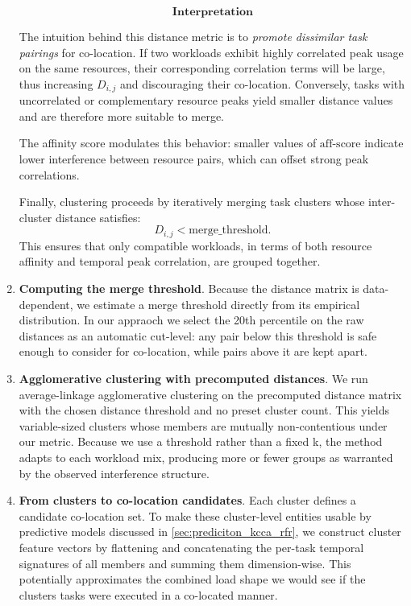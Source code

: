 \begin{enumerate}
          \[
              \textbf{Interpretation}
          \]

          The intuition behind this distance metric is to
          \emph{promote dissimilar task pairings} for co-location.
          If two workloads exhibit highly correlated peak usage on the same resources,
          their corresponding correlation terms will be large,
          thus increasing \( D_{i,j} \) and discouraging their co-location.
          Conversely, tasks with uncorrelated or complementary resource peaks
          yield smaller distance values and are therefore more suitable to merge.

          The affinity score modulates this behavior:
          smaller values of \( \mathrm{aff\text{-}score} \)
          indicate lower interference between resource pairs,
          which can offset strong peak correlations.

          Finally, clustering proceeds by iteratively merging task clusters
          whose inter-cluster distance satisfies:
          \[
              D_{i,j} < \text{merge\_threshold}.
          \]
          This ensures that only compatible workloads, in terms of both
          resource affinity and temporal peak correlation, are grouped together.
    \item \textbf{Computing the merge threshold}. Because the distance matrix is data-dependent, we estimate a merge threshold directly from its empirical distribution. In our appraoch we select the 20th percentile on the raw distances as an automatic cut-level: any pair below this threshold is safe enough to consider for co-location, while pairs above it are kept apart.
    \item \textbf{Agglomerative clustering with precomputed distances}. We run average-linkage agglomerative clustering on the precomputed distance matrix with the chosen distance threshold and no preset cluster count. This yields variable-sized clusters whose members are mutually non-contentious under our metric. Because we use a threshold rather than a fixed k, the method adapts to each workload mix, producing more or fewer groups as warranted by the observed interference structure.
    \item\textbf{From clusters to co-location candidates}. Each cluster defines a candidate co-location set. To make these cluster-level entities usable by predictive models discussed in \ref{sec:prediciton_kcca_rfr}, we construct cluster feature vectors by flattening and concatenating the per-task temporal signatures of all members and summing them dimension-wise. This potentially approximates the combined load shape we would see if the clusters tasks were executed in a co-located manner.
\end{enumerate}


